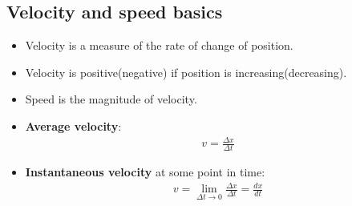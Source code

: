 \documentclass[aspectratio=169,
hyperref={colorlinks,urlcolor=blue}
]{beamer}
\begin{document}
\begin{frame}
\titlepage
\thispagestyle{empty}
\end{frame}







\subsection{Velocity and speed basics}
\label{subsec:velocityandspeedbasics}
{
\begin{itemize}
\item Velocity is a measure of the rate of change of position.
\item Velocity is positive(negative) if position is increasing(decreasing).
\item Speed is the magnitude of velocity.
\item \textbf{Average velocity}:
\begin{align*}
v=\frac{\Delta x}{\Delta t}
\end{align*}
\item<2-> \textbf{Instantaneous velocity} at some point in time:
\begin{align*}
v=\lim_{\Delta t \to 0}\frac{\Delta x}{\Delta t}=\frac{dx}{dt}
\end{align*}
\end{itemize}
}
\end{document}
